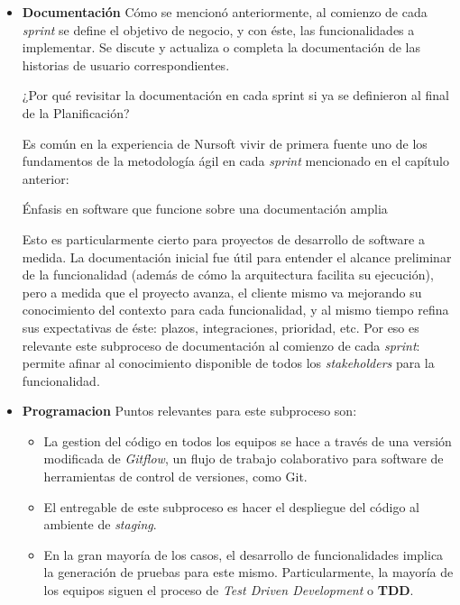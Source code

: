 \begin{itemize}
  \item \textbf{Documentación}
  Cómo se mencionó anteriormente, al comienzo de cada \textit{sprint} se define el objetivo de negocio, y con éste,
  las funcionalidades a implementar. Se discute y actualiza o completa la documentación de las
  historias de usuario correspondientes. 
  
  ¿Por qué revisitar la documentación en cada sprint si ya se definieron al final de la Planificación?

  Es común en la experiencia de Nursoft vivir de primera fuente uno de los fundamentos de la metodología ágil en
  cada \textit{sprint} mencionado en el capítulo anterior: 
  
  \begin{displayquote}
    Énfasis en software que funcione sobre una documentación amplia
  \end{displayquote}

  Esto es particularmente cierto para proyectos de desarrollo de software a medida.
  La documentación inicial fue útil para entender el alcance preliminar de la funcionalidad
  (además de cómo la arquitectura facilita su ejecución), pero a medida que el proyecto avanza,
  el cliente mismo va mejorando su conocimiento del contexto para cada funcionalidad, y al mismo tiempo refina
  sus expectativas de éste: plazos, integraciones, prioridad, etc. Por eso es relevante este subproceso de documentación
  al comienzo de cada \textit{sprint}: permite afinar al conocimiento disponible de todos los \textit{stakeholders} para la funcionalidad.

  \item \textbf{Programacion}
  Puntos relevantes para este subproceso son:
  \begin{itemize}
    \item La gestion del código en todos los equipos se hace a través de una versión modificada de \textit{Gitflow},
    un flujo de trabajo colaborativo para software de herramientas de control de versiones, como Git.
    \item El entregable de este subproceso es hacer el despliegue del código al ambiente de \textit{staging}.
    \item En la gran mayoría de los casos, el desarrollo de funcionalidades implica la generación de pruebas para este mismo.
    Particularmente, la mayoría de los equipos siguen el proceso de \textit{Test Driven Development} o \textbf{TDD}.
  \end{itemize}


\end{itemize}
